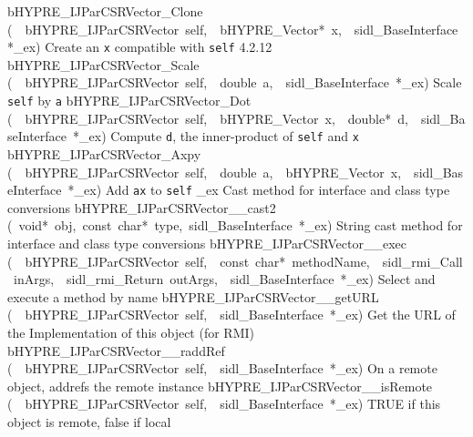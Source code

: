 \documentclass{article}
\begin{document}
\begin{cxxentry}
\begin{cxxentry}
\begin{cxxnames}
\label{cxx.4.2.21}
        {bHYPRE\_IJParCSRVector\_Clone}
        {(\ \ bHYPRE\_IJParCSRVector\ self,\ \ bHYPRE\_Vector*\ x,\ \ sidl\_BaseInterface\ *\_ex)}
        {
Create an {\tt x} compatible with {\tt self}}
        {4.2.12}
        {bHYPRE\_IJParCSRVector\_Scale}
        {(\ \ bHYPRE\_IJParCSRVector\ self,\ \ double\ a,\ \ sidl\_BaseInterface\ *\_ex)}
        {
Scale {\tt self} by {\tt a}}
        {}
\label{cxx.4.2.22}
        {bHYPRE\_IJParCSRVector\_Dot}
        {(\ \ bHYPRE\_IJParCSRVector\ self,\ \ bHYPRE\_Vector\ x,\ \ double*\ d,\ \ sidl\_BaseInterface\ *\_ex)}
        {
Compute {\tt d}, the inner-product of {\tt self} and {\tt x}}
        {}
\label{cxx.4.2.23}
        {bHYPRE\_IJParCSRVector\_Axpy}
        {(\ \ bHYPRE\_IJParCSRVector\ self,\ \ double\ a,\ \ bHYPRE\_Vector\ x,\ \ sidl\_BaseInterface\ *\_ex)}
        {
Add {\tt a}{\tt x} to {\tt self}}
        {}
\label{cxx.4.2.24}
        {\_ex}
        {}
        {
Cast method for interface and class type conversions}
        {}
\label{cxx.4.2.25}
        {bHYPRE\_IJParCSRVector\_\_cast2}
        {(\ void*\ obj,\ const\ char*\ type,\ sidl\_BaseInterface\ *\_ex)}
        {
String cast method for interface and class type conversions}
        {}
\label{cxx.4.2.26}
        {bHYPRE\_IJParCSRVector\_\_exec}
        {(\ \ bHYPRE\_IJParCSRVector\ self,\ \ const\ char*\ methodName,\ \ sidl\_rmi\_Call\ inArgs,\ \ sidl\_rmi\_Return\ outArgs,\ \ sidl\_BaseInterface\ *\_ex)}
        {
Select and execute a method by name}
        {}
\label{cxx.4.2.27}
        {bHYPRE\_IJParCSRVector\_\_getURL}
        {(\ \ bHYPRE\_IJParCSRVector\ self,\ \ sidl\_BaseInterface\ *\_ex)}
        {
Get the URL of the Implementation of this object (for RMI)}
        {}
\label{cxx.4.2.28}
        {bHYPRE\_IJParCSRVector\_\_raddRef}
        {(\ \ bHYPRE\_IJParCSRVector\ self,\ \ sidl\_BaseInterface\ *\_ex)}
        {
On a remote object, addrefs the remote instance}
        {}
\label{cxx.4.2.29}
        {bHYPRE\_IJParCSRVector\_\_isRemote}
        {(\ \ bHYPRE\_IJParCSRVector\ self,\ \ sidl\_BaseInterface\ *\_ex)}
        {
TRUE if this object is remote, false if local}

\end{cxxnames}
\end{cxxentry}
\end{cxxentry}
\end{document}
